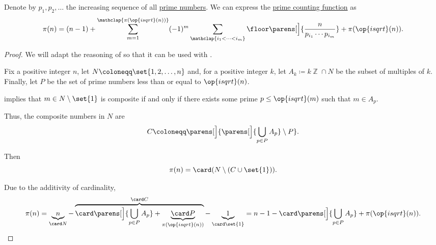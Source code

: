 \begin{proposition}\label{thm:inclusion_exclusion_eratosthenes}
  Denote by \( p_1, p_2, \ldots \) the increasing sequence of all \hyperref[def:prime_number]{prime numbers}. We can express the \hyperref[def:prime_counting_function]{prime counting function} as
  \begin{equation}\label{eq:thm:inclusion_exclusion_eratosthenes}
    \pi(n) = (n - 1) + \sum_{m=1}^{\mathclap{\pi(\op{isqrt}(n))}} (-1)^m \sum_{\mathclap{i_1 < \cdots < i_m}} \floor\parens[\Big]{ \frac n {p_{i_1} \cdots p_{i_m}} } + \pi(\op{isqrt}(n)).
  \end{equation}
\end{proposition}
\begin{proof}
  We will adapt the reasoning of  so that it can be used with .

  Fix a positive integer \( n \), let \( N \coloneqq \set{ 1, 2, \ldots, n } \) and, for a positive integer \( k \), let \( A_k \coloneqq k\BbbZ \cap N \) be the subset of multiples of \( k \). Finally, let \( P \) be the set of prime numbers less than or equal to \( \op{isqrt}(n) \).

   implies that \( m \in N \setminus \set{ 1 } \) is composite if and only if there exists some prime \( p \leq \op{isqrt}(m) \) such that \( m \in A_p \).

  Thus, the composite numbers in \( N \) are
  \begin{equation*}
    C \coloneqq \parens[\Big]{ \parens[\Big]{ \bigcup_{p \in P} A_p } \setminus P }.
  \end{equation*}

  Then
  \begin{equation*}
    \pi(n) = \card(N \setminus (C \cup \set{ 1 })).
  \end{equation*}

  Due to the additivity of cardinality,
  \begin{equation}\label{eq:thm:inclusion_exclusion_eratosthenes/sets}
    \pi(n)
    =
    \underbrace{n}_{\card N} - \overbrace{\card\parens[\Big]{ \bigcup_{p \in P} A_p } + \underbrace{\card P}_{\pi(\op{isqrt}(n))}}^{\card C} - \underbrace{1}_{\card\set{ 1 }}
    =
    n - 1 - \card\parens[\Big]{ \bigcup_{p \in P} A_p } + \pi(\op{isqrt}(n)).
  \end{equation}


\end{proof}
